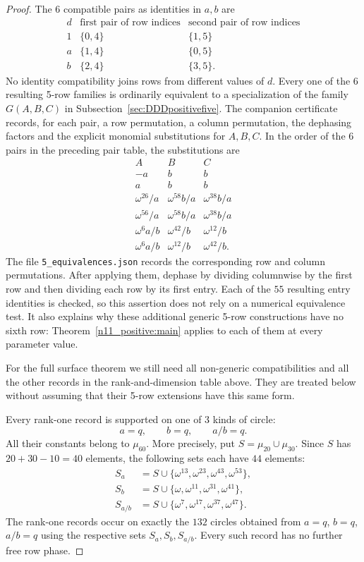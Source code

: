 \documentclass[11pt,a4paper]{article}
\theoremstyle{plain}
\theoremstyle{definition}
\theoremstyle{plain}
\begin{document}
\begin{proof}
The 6 compatible pairs as identities in $a,b$ are
\[
\begin{array}{c|cc}
d&\text{first pair of row indices}&\text{second pair of row indices}\\\hline
1&\{0,4\}&\{1,5\}\\
a&\{1,4\}&\{0,5\}\\
b&\{2,4\}&\{3,5\}.
\end{array}
\]
No identity compatibility joins rows from different values of $d$. Every one of the 6 resulting 5-row families is ordinarily equivalent to a specialization of the family $G(A,B,C)$ in Subsection~\ref{sec:DDDpositivefive}. The companion certificate records, for each pair, a row permutation, a column permutation, the dephasing factors and the explicit monomial substitutions for $A,B,C$. In the order of the 6 pairs in the preceding pair table, the substitutions are
\[
\begin{array}{c|c|c}
A&B&C\\\hline
-a&b&b\\
a&b&b\\
\omega^{26}/a&\omega^{58}b/a&\omega^{38}b/a\\
\omega^{56}/a&\omega^{58}b/a&\omega^{38}b/a\\
\omega^{6}a/b&\omega^{42}/b&\omega^{12}/b\\
\omega^{6}a/b&\omega^{12}/b&\omega^{42}/b.
\end{array}
\]
The file \texttt{5\_equivalences.json} records the corresponding row and column permutations. After applying them, dephase by dividing columnwise by the first row and then dividing each row by its first entry. Each of the $55$ resulting entry identities is checked, so this assertion does not rely on a numerical equivalence test. It also explains why these additional generic 5-row constructions have no sixth row: Theorem~\ref{n11_positive:main} applies to each of them at every parameter value.

For the full surface theorem we still need all non-generic compatibilities and all the other records in the rank-and-dimension table above. They are treated below without assuming that their 5-row extensions have this same form.

\medskip
Every rank-one record is supported on one of 3 kinds of circle:
\[
a=q,\qquad b=q,\qquad a/b=q.
\]
All their constants belong to $\mu_{60}$. More precisely, put $S=\mu_{20}\cup\mu_{30}$. Since $S$ has $20+30-10=40$ elements, the following sets each have $44$ elements:
\[
\begin{split}
S_a&=S\cup\{\omega^{13},\omega^{23},\omega^{43},\omega^{53}\},\\
S_b&=S\cup\{\omega,\omega^{11},\omega^{31},\omega^{41}\},\\
S_{a/b}&=S\cup\{\omega^{7},\omega^{17},\omega^{37},\omega^{47}\}.
\end{split}
\]
The rank-one records occur on exactly the $132$ circles obtained from $a=q$, $b=q$, $a/b=q$ using the respective sets $S_a,S_b,S_{a/b}$. Every such record has no further free row phase.


\end{proof}
\end{document}
